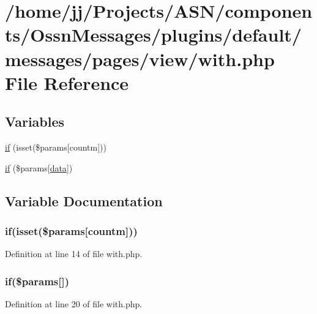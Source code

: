 \hypertarget{with_8php}{}\section{/home/jj/\+Projects/\+A\+S\+N/components/\+Ossn\+Messages/plugins/default/messages/pages/view/with.php File Reference}
\label{with_8php}
\subsection*{Variables}
\begin{DoxyCompactItemize}
\item 
\hyperlink{with_8php_a931b0e32138cc8cba2489c6ea97e78ba}{if} (isset(\$params\mbox{[}\textquotesingle{}countm\textquotesingle{}\mbox{]}))
\item 
\hyperlink{with_8php_a60b4711022687689d537de0646f08920}{if} (\$params\mbox{[}\textquotesingle{}\hyperlink{components_2_ossn_comments_2actions_2comment_2edit_8php_a2b67189b42ab547221cb2a6408f4746a}{data}\textquotesingle{}\mbox{]})
\end{DoxyCompactItemize}


\subsection{Variable Documentation}
\subsubsection[{\texorpdfstring{if}{if}}]{\setlength{\rightskip}{0pt plus 5cm}if(isset(\$params\mbox{[}\textquotesingle{}countm\textquotesingle{}\mbox{]}))}\hypertarget{with_8php_a931b0e32138cc8cba2489c6ea97e78ba}{}\label{with_8php_a931b0e32138cc8cba2489c6ea97e78ba}


Definition at line 14 of file with.\+php.

\subsubsection[{\texorpdfstring{if}{if}}]{\setlength{\rightskip}{0pt plus 5cm}if(\$params\mbox{[}\textquotesingle{}\mbox{]})}\hypertarget{with_8php_a60b4711022687689d537de0646f08920}{}\label{with_8php_a60b4711022687689d537de0646f08920}


Definition at line 20 of file with.\+php.

